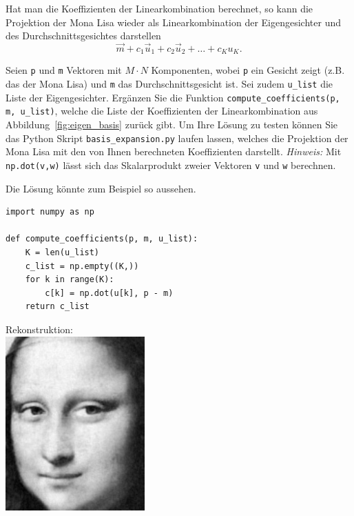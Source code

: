 Hat man die Koeffizienten der Linearkombination berechnet, so kann die Projektion der Mona Lisa wieder als Linearkombination der Eigengesichter und des Durchschnittsgesichtes darstellen
\begin{equation*}
	\vec m+c_1\vec u_1+c_2\vec u_2+\ldots+c_Ku_K.
\end{equation*}
\begin{aufgabe} \label{aufg:compute_coefficients}
	Seien \texttt{p} und \texttt{m} Vektoren mit $M\cdot N$ Komponenten, wobei \texttt{p} ein Gesicht zeigt (z.B. das der Mona Lisa) und \texttt{m} das Durchschnittsgesicht ist.
	Sei zudem \texttt{u\_list} die Liste der Eigengesichter.
	Ergänzen Sie die Funktion \texttt{compute\_coefficients(p, m, u\_list)}, welche die Liste der Koeffizienten der Linearkombination aus Abbildung~\ref{fig:eigen_basis} zurück gibt.
	Um Ihre Lösung zu testen können Sie das Python Skript \texttt{basis\_expansion.py} laufen lassen, welches die Projektion der Mona Lisa mit den von Ihnen berechneten Koeffizienten darstellt.
	\textit{Hinweis:} Mit \texttt{np.dot(v,w)} lässt sich das Skalarprodukt zweier Vektoren \texttt{v} und \texttt{w} berechnen.
\end{aufgabe}
\begin{losung}
	Die Lösung könnte zum Beispiel so aussehen.\\[0.5cm]
	\begin{minipage}{0.65\textwidth}
\begin{lstlisting}[style=python]
import numpy as np

def compute_coefficients(p, m, u_list):
	K = len(u_list)
	c_list = np.empty((K,))
	for k in range(K):
		c[k] = np.dot(u[k], p - m)
	return c_list
\end{lstlisting}
	\end{minipage}\hfill
	\begin{minipage}{0.35\textwidth}\vspace{-1cm}
		\centering Rekonstruktion:\\[0.5cm]
		\includegraphics[width=0.4\textwidth]{images/eigenfaces/mona_lisa_eigen_approx}
	\end{minipage}
\end{losung}

